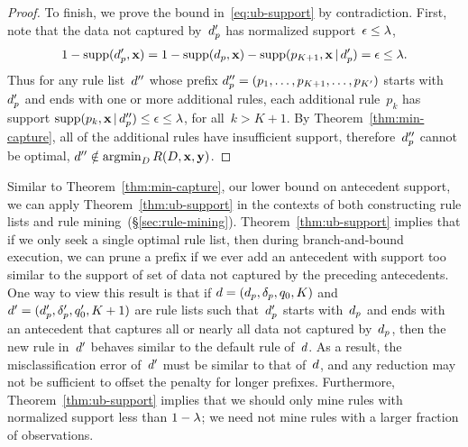 \begin{arxiv}
\begin{proof}
To finish, we prove the bound in~\eqref{eq:ub-support} by contradiction.
%
First, note that the data not captured by~$d_p'$
has normalized support~${\epsilon \le {\lambda}}$, \ie
\begin{align}
1 - \Supp(\Prefix', \x) = 1 - \Supp(\Prefix, \x) - \Supp(p_{K+1}, \x \given \Prefix') = \epsilon \le \Reg.
\end{align}
Thus for any rule list~${d}''$ whose prefix
$d_p'' = (p_1, \dots, p_{K+1}, \dots, p_{K'})$ starts
with~$d_p'$ and ends with one or more additional rules,
each additional rule~$p_k$ has support
${\textnormal{supp}(p_k, \mathbf{x} \,|\, d_p'') \le \epsilon \le {\lambda}}$,
for all~${k > K+1}$.
%
By Theorem~\ref{thm:min-capture},
all of the additional rules have insufficient support,
therefore~$d_p''$ cannot be optimal,
\ie ${{d}'' \notin \operatorname*{argmin}_{{D}} R({D}, \mathbf{x}, \mathbf{y})}$.
\end{proof}

Similar to Theorem~\ref{thm:min-capture}, our lower bound on
antecedent support, we can apply Theorem~\ref{thm:ub-support}
in the contexts of both constructing rule lists and
rule mining~(\S\ref{sec:rule-mining}).
%
Theorem~\ref{thm:ub-support} implies that if we only seek a single
optimal rule list, then during branch-and-bound execution,
we can prune a prefix if we ever add an antecedent with support
too similar to the support of set of data not captured by the
preceding antecedents.
%
One way to view this result is that if
${{d} = (d_p, \delta_p, q_0, K)}$
and ${{d}' = (d_p', \delta_p', q_0', K + 1)}$
are rule lists such that~$d_p'$ starts with~$d_p$
and ends with an antecedent that captures all or nearly all
data not captured by~$d_p$, then the new rule in~${d}'$
behaves similar to the default rule of~${d}$.
%
As a result, the misclassification error of~${d}'$ must be
similar to that of~${d}$, and any reduction may not be
sufficient to offset the penalty for longer prefixes.
%
Furthermore, Theorem~\ref{thm:ub-support} implies that we should
only mine rules with normalized support less than ${1 - {\lambda}}$;
we need not mine rules with a larger fraction of observations.
\end{arxiv}

